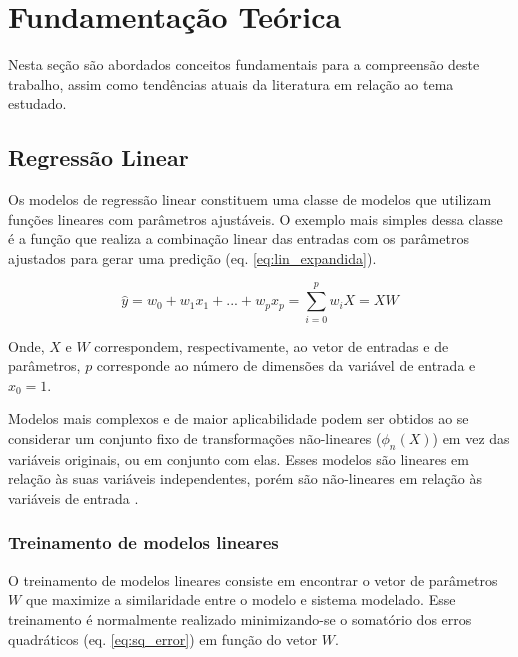 \chapter[Fundamentação Teórica]{Fundamentação Teórica}

Nesta seção são abordados conceitos fundamentais para a compreensão deste trabalho, assim como tendências atuais da literatura em relação ao tema estudado.

\section{Regressão Linear}

Os modelos de regressão linear constituem uma classe de modelos que utilizam funções lineares com parâmetros ajustáveis. O exemplo mais simples dessa classe é a função que realiza a combinação linear das entradas com os parâmetros ajustados para gerar uma predição (eq. \ref{eq:lin_expandida}).

\begin{equation}
    \hat{y} = w_0 + w_1x_1+ ... + w_px_p = \sum_{i = 0}^{p} w_iX = XW
    \label{eq:lin_expandida}
\end{equation}

Onde, $X$ e $W$ correspondem, respectivamente, ao vetor de entradas e de parâmetros, $p$ corresponde ao número de dimensões da variável de entrada e $x_0 = 1$.

Modelos mais complexos e de maior aplicabilidade podem ser obtidos ao se considerar um conjunto fixo de 
transformações não-lineares ($\phi_n(X)$) em vez das variáveis originais, ou em conjunto com elas. 
Esses modelos são lineares em relação às suas variáveis independentes, porém são não-lineares em relação às variáveis de entrada \cite{bishop_2006}.

\subsection{Treinamento de modelos lineares}

O treinamento de modelos lineares consiste em encontrar o vetor de parâmetros $W$ que maximize a similaridade entre o modelo e sistema modelado. Esse treinamento é normalmente realizado minimizando-se o somatório dos erros quadráticos (eq. \ref{eq:sq_error}) em função do vetor $W$.


